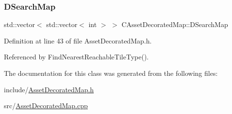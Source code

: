 \subsubsection{\texorpdfstring{D\+Search\+Map}{DSearchMap}}
{\footnotesize\ttfamily std\+::vector$<$ std\+::vector$<$ int $>$ $>$ C\+Asset\+Decorated\+Map\+::\+D\+Search\+Map\hspace{0.3cm}{\ttfamily [protected]}}



Definition at line 43 of file Asset\+Decorated\+Map.\+h.



Referenced by Find\+Nearest\+Reachable\+Tile\+Type().



The documentation for this class was generated from the following files\+:\begin{DoxyCompactItemize}
\item 
include/\hyperlink{AssetDecoratedMap_8h}{Asset\+Decorated\+Map.\+h}\item 
src/\hyperlink{AssetDecoratedMap_8cpp}{Asset\+Decorated\+Map.\+cpp}\end{DoxyCompactItemize}
